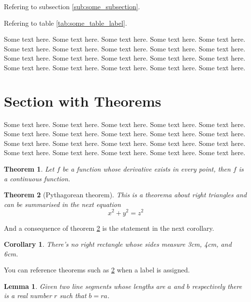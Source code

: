 \documentclass[11pt,twoside]{article}
\theoremstyle{plain}
\newtheorem{theorem}{Theorem}[section]
\newtheorem{lemma}{Lemma}[section]
\newtheorem{corollary}{Corollary}[theorem]
\theoremstyle{definition}
\theoremstyle{remark}
\begin{document}
Refering to subsection \ref{sub:some_subsection}.

Refering to table \ref{tab:some_table_label}.

Some text here. Some text here. Some text here. Some text here.
Some text here. Some text here. Some text here. Some text here.
Some text here. Some text here. Some text here. Some text here.
Some text here. Some text here. Some text here. Some text here.
Some text here. Some text here. Some text here. Some text here.





\section{Section with Theorems} %
\label{sec:section_with_theorems}

Some text here. Some text here. Some text here. Some text here.
Some text here. Some text here. Some text here. Some text here.
Some text here. Some text here. Some text here. Some text here.
Some text here. Some text here. Some text here. Some text here.
Some text here. Some text here. Some text here. Some text here.

\begin{theorem}
Let $f$ be a function whose derivative exists in every point, then $f$ is
a continuous function.
\end{theorem}

\begin{theorem}[Pythagorean theorem]\label{the:pythagorean}
This is a theorema about right triangles and can be summarised in the next
equation
\begin{equation*}
  x^2 + y^2 = z^2
\end{equation*}
\end{theorem}

And a consequence of theorem \ref{the:pythagorean} is the statement in the next
corollary.

\begin{corollary}
There's no right rectangle whose sides measure 3cm, 4cm, and 6cm.
\end{corollary}

You can reference theorems such as \ref{the:pythagorean} when a label is assigned.

\begin{lemma}
Given two line segments whose lengths are $a$ and $b$ respectively there is a
real number $r$ such that $b=ra$.
\end{lemma}
\end{document}
